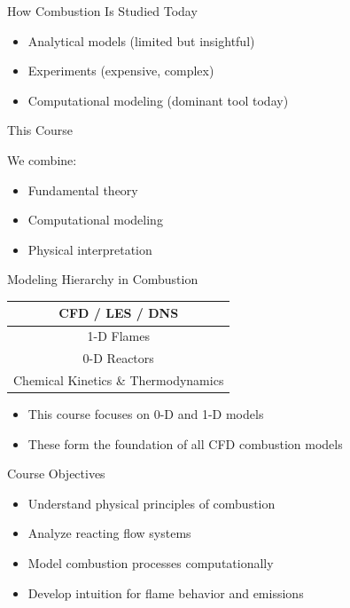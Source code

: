 \documentclass[aspectratio=169]{beamer}
\begin{document}
\begin{frame}{How Combustion Is Studied Today}
\begin{itemize}
  \item Analytical models (limited but insightful)
  \item Experiments (expensive, complex)
  \item \alert{Computational modeling} (dominant tool today)
\end{itemize}

\vspace{0.5cm}

\begin{block}{This Course}

We combine:

\begin{itemize}
  \item Fundamental theory
  \item Computational modeling
  \item Physical interpretation
\end{itemize}
\end{block}
\end{frame}

\begin{frame}{Modeling Hierarchy in Combustion}

\begin{center}
\begin{tabular}{c}
CFD / LES / DNS \\ \hline
1-D Flames \\ \hline
0-D Reactors \\ \hline
Chemical Kinetics \& Thermodynamics
\end{tabular}
\end{center}

\vspace{0.4cm}

\begin{itemize}
  \item This course focuses on 0-D and 1-D models
  \item These form the foundation of all CFD combustion models
\end{itemize}
\end{frame}

\begin{frame}{Course Objectives}

\begin{itemize}
  \item Understand physical principles of combustion
  \item Analyze reacting flow systems
  \item Model combustion processes computationally
  \item Develop intuition for flame behavior and emissions
\end{itemize}
\end{frame}
\end{document}

